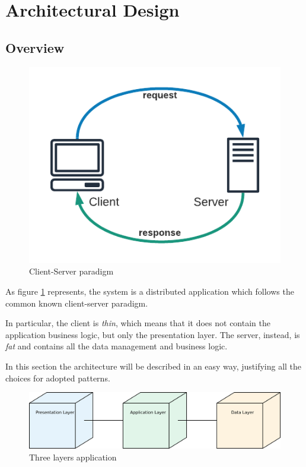 \documentclass[table, 12pt]{article}
\begin{document}
\newpage

\section{Architectural Design}
\subsection{Overview}
\begin{figure}[H]
    \begin{center}
        \includegraphics[width=\textwidth/2]{assets/Architectural-Design/Client-Server.png}
        \caption{Client-Server paradigm}
        \label{client_server_par}
    \end{center}
\end{figure}

As figure \ref{client_server_par} represents, the system is a distributed application which follows the common known client-server paradigm.

In particular, the client is \textit{thin}, which means that it does not contain the application business logic, but only the presentation layer. The server, instead, is \textit{fat} and contains all the data management and business logic.

In this section the architecture will be described in an easy way, justifying all the choices for adopted patterns.

\begin{figure}[H]
    \begin{center}
        \includegraphics[width=\textwidth]{assets/Architectural-Design/3-tier.png}
        \caption{Three layers application}
        \label{three_tier_desc}
    \end{center}
\end{figure}
\end{document}
